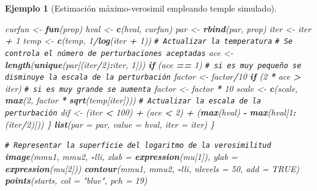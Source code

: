\documentclass[
  spanish,
  10pt,
]{book}
\newenvironment{Shaded}{\begin{snugshade}}{\end{snugshade}}
\newcommand{\AttributeTok}[1]{\textcolor[rgb]{0.13,0.29,0.53}{#1}}
\newcommand{\CommentTok}[1]{\textcolor[rgb]{0.56,0.35,0.01}{\textit{#1}}}
\newcommand{\ConstantTok}[1]{\textcolor[rgb]{0.56,0.35,0.01}{#1}}
\newcommand{\ControlFlowTok}[1]{\textcolor[rgb]{0.13,0.29,0.53}{\textbf{#1}}}
\newcommand{\DecValTok}[1]{\textcolor[rgb]{0.00,0.00,0.81}{#1}}
\newcommand{\FunctionTok}[1]{\textcolor[rgb]{0.13,0.29,0.53}{\textbf{#1}}}
\newcommand{\NormalTok}[1]{#1}
\newcommand{\OtherTok}[1]{\textcolor[rgb]{0.56,0.35,0.01}{#1}}
\newcommand{\SpecialCharTok}[1]{\textcolor[rgb]{0.81,0.36,0.00}{\textbf{#1}}}
\newcommand{\StringTok}[1]{\textcolor[rgb]{0.31,0.60,0.02}{#1}}
\theoremstyle{break}
\newtheorem{example}{Ejemplo}[chapter]
\theoremstyle{nonumberplain}
\renewcommand{\CommentTok}[1]{\textcolor[rgb]{0.41,0.41,0.41}{\texttt{#1}}}
\begin{document}
\begin{example}[Estimación máximo-verosimil empleando temple simulado]
\begin{Shaded}
\begin{Highlighting}[]
\NormalTok{    curfun }\OtherTok{\textless{}{-}} \FunctionTok{fun}\NormalTok{(prop)}
\NormalTok{    hval }\OtherTok{\textless{}{-}} \FunctionTok{c}\NormalTok{(hval, curfun)}
\NormalTok{    par }\OtherTok{\textless{}{-}} \FunctionTok{rbind}\NormalTok{(par, prop)}
\NormalTok{    iter }\OtherTok{\textless{}{-}}\NormalTok{ iter }\SpecialCharTok{+} \DecValTok{1}
\NormalTok{    temp }\OtherTok{\textless{}{-}} \FunctionTok{c}\NormalTok{(temp, }\DecValTok{1}\SpecialCharTok{/}\FunctionTok{log}\NormalTok{(iter }\SpecialCharTok{+} \DecValTok{1}\NormalTok{))  }\CommentTok{\# Actualizar la temperatura}
    \CommentTok{\# Se controla el número de perturbaciones aceptadas}
\NormalTok{    ace }\OtherTok{\textless{}{-}} \FunctionTok{length}\NormalTok{(}\FunctionTok{unique}\NormalTok{(par[(iter}\SpecialCharTok{/}\DecValTok{2}\NormalTok{)}\SpecialCharTok{:}\NormalTok{iter, }\DecValTok{1}\NormalTok{]))}
    \ControlFlowTok{if}\NormalTok{ (ace }\SpecialCharTok{==} \DecValTok{1}\NormalTok{) }
      \CommentTok{\# si es muy pequeño se disminuye la escala de la perturbación}
\NormalTok{      factor }\OtherTok{\textless{}{-}}\NormalTok{ factor}\SpecialCharTok{/}\DecValTok{10}
    \ControlFlowTok{if}\NormalTok{ (}\DecValTok{2} \SpecialCharTok{*}\NormalTok{ ace }\SpecialCharTok{\textgreater{}}\NormalTok{ iter) }
      \CommentTok{\# si es muy grande se aumenta}
\NormalTok{      factor }\OtherTok{\textless{}{-}}\NormalTok{ factor }\SpecialCharTok{*} \DecValTok{10}
\NormalTok{    scale }\OtherTok{\textless{}{-}} \FunctionTok{c}\NormalTok{(scale, }\FunctionTok{max}\NormalTok{(}\DecValTok{2}\NormalTok{, factor }\SpecialCharTok{*} \FunctionTok{sqrt}\NormalTok{(temp[iter])))  }\CommentTok{\# Actualizar la escala de la perturbación}
\NormalTok{    dif }\OtherTok{\textless{}{-}}\NormalTok{ (iter }\SpecialCharTok{\textless{}} \DecValTok{100}\NormalTok{) }\SpecialCharTok{+}\NormalTok{ (ace }\SpecialCharTok{\textless{}} \DecValTok{2}\NormalTok{) }\SpecialCharTok{+}\NormalTok{ (}\FunctionTok{max}\NormalTok{(hval) }\SpecialCharTok{{-}} \FunctionTok{max}\NormalTok{(hval[}\DecValTok{1}\SpecialCharTok{:}\NormalTok{(iter}\SpecialCharTok{/}\DecValTok{2}\NormalTok{)]))}
\NormalTok{  \}}
  \FunctionTok{list}\NormalTok{(}\AttributeTok{par =}\NormalTok{ par, }\AttributeTok{value =}\NormalTok{ hval, }\AttributeTok{iter =}\NormalTok{ iter)}
\NormalTok{\}}

\CommentTok{\# Representar la superficie del logaritmo de la verosimilitud}
\FunctionTok{image}\NormalTok{(mmu1, mmu2, }\SpecialCharTok{{-}}\NormalTok{lli, }\AttributeTok{xlab =} \FunctionTok{expression}\NormalTok{(mu[}\DecValTok{1}\NormalTok{]), }\AttributeTok{ylab =} \FunctionTok{expression}\NormalTok{(mu[}\DecValTok{2}\NormalTok{]))}
\FunctionTok{contour}\NormalTok{(mmu1, mmu2, }\SpecialCharTok{{-}}\NormalTok{lli, }\AttributeTok{nlevels =} \DecValTok{50}\NormalTok{, }\AttributeTok{add =} \ConstantTok{TRUE}\NormalTok{)}
\FunctionTok{points}\NormalTok{(starts, }\AttributeTok{col =} \StringTok{"blue"}\NormalTok{, }\AttributeTok{pch =} \DecValTok{19}\NormalTok{)}


\end{Highlighting}
\end{Shaded}
\end{example}
\end{document}
